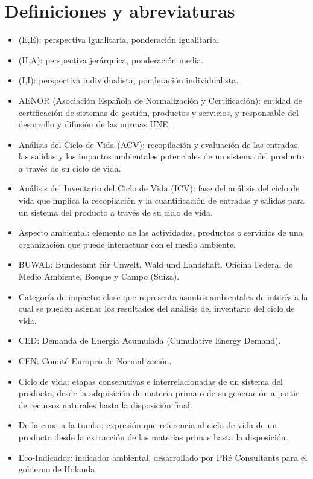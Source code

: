 \chapter{Definiciones y abreviaturas}\label{cap:definiciones}
\begin{itemize}
  \item (E,E): perspectiva igualitaria, ponderación igualitaria.
  \item (H,A): perspectiva jerárquica, ponderación media.
  \item (I,I): perspectiva individualista, ponderación individualista.
  \item AENOR (Asociación Española de Normalización y Certificación): entidad de certificación de sistemas de gestión, productos y servicios, y responsable del desarrollo y difusión de las normas UNE.
  \item Análisis del Ciclo de Vida (ACV): recopilación y evaluación de las entradas, las salidas y los impactos ambientales potenciales de un sistema del producto a través de su ciclo de vida.
  \item Análisis del Inventario del Ciclo de Vida (ICV): fase del análisis del ciclo de vida que implica la recopilación y la cuantificación de entradas y salidas para un sistema del producto a través de su ciclo de vida.
  \item Aspecto ambiental: elemento de las actividades, productos o servicios de una organización que puede interactuar con el medio ambiente.
  \item BUWAL: Bundesamt für Unwelt, Wald und Landshaft. Oficina Federal de Medio Ambiente, Bosque y Campo (Suiza).
  \item Categoría de impacto: clase que representa asuntos ambientales de interés a la cual se pueden asignar los resultados del análisis del inventario del ciclo de vida.
  \item CED: Demanda de Energía Acumulada (Cumulative Energy Demand).
  \item CEN: Comité Europeo de Normalización.
  \item Ciclo de vida: etapas consecutivas e interrelacionadas de un sistema del producto, desde la adquisición de materia prima o de su generación a partir de recursos naturales hasta la disposición final.
  \item De la cuna a la tumba: expresión que referencia al ciclo de vida de un producto desde la extracción de las materias primas hasta la disposición.
  \item Eco-Indicador: indicador ambiental, desarrollado por PRé Consultants para el gobierno de Holanda.

\end{itemize}
